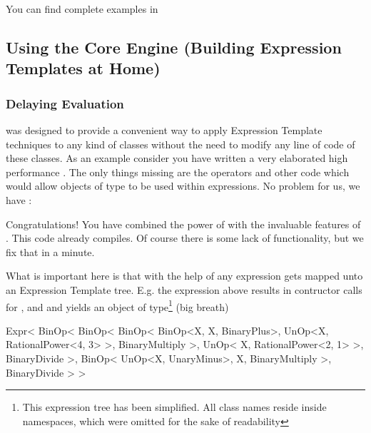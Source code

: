 You can find complete examples in 



\subsection{Using the Core Engine (Building Expression Templates at Home)}
\label{sec: Using the Core Engine (Building Expression Templates at Home)}


\subsubsection{Delaying Evaluation}


\Daixtrose was designed to provide a convenient way to apply Expression Template
techniques to any kind of \CC classes without the need to modify any line of
code of these classes. As an example consider you have written a very elaborated
high performance . The only things missing are the operators
and other code which would allow objects of type  to be used within
expressions. No problem for us, we have \Daixtrose:
%

Congratulations! You have combined the power of  with the
invaluable features of \Daixtrose. This code already compiles.  Of course there
is some lack of functionality, but we fix that in a minute.

What is important here is that with the help of  any expression gets mapped unto an Expression Template
tree.  E.g. the expression above results in contructor calls for
,  and  and yields an
object of type\footnote{This expression tree has been simplified. All class
  names reside inside namespaces, which were omitted for the sake of readability
} (big breath)
%
\begin{code}
Expr<
     BinOp<
           BinOp<
                 BinOp<
                       BinOp<X, X, BinaryPlus>, 
                       UnOp<X, RationalPower<4, 3> >,
                       BinaryMultiply
                       >, 
                 UnOp<
                      X, 
                      RationalPower<2, 1> 
                      >, 
                 BinaryDivide
                 >, 
           BinOp<
                 UnOp<X, UnaryMinus>, 
                 X, 
                 BinaryMultiply
                 >, 
           BinaryDivide
           >
     >
\end{code}


